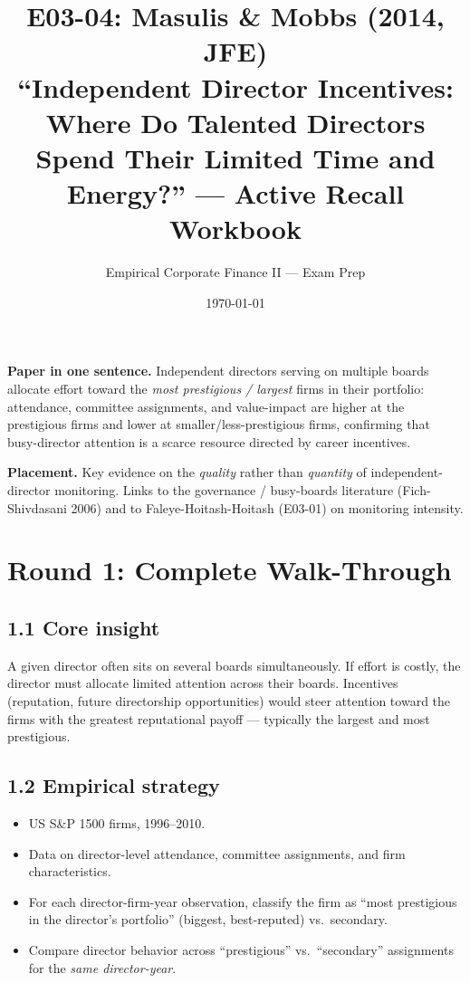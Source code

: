 \documentclass[11pt]{article}
\title{E03-04: Masulis \& Mobbs (2014, JFE) \\
\large ``Independent Director Incentives: Where Do Talented Directors Spend Their Limited Time and Energy?'' --- Active Recall Workbook}
\author{Empirical Corporate Finance II --- Exam Prep}
\date{\today}
\begin{document}
\maketitle

\begin{keybox}
\textbf{Paper in one sentence.} Independent directors serving on multiple boards allocate effort toward the \emph{most prestigious / largest} firms in their portfolio: attendance, committee assignments, and value-impact are higher at the prestigious firms and lower at smaller/less-prestigious firms, confirming that busy-director attention is a scarce resource directed by career incentives.

\textbf{Placement.} Key evidence on the \emph{quality} rather than \emph{quantity} of independent-director monitoring. Links to the governance / busy-boards literature (Fich-Shivdasani 2006) and to Faleye-Hoitash-Hoitash (E03-01) on monitoring intensity.
\end{keybox}

\section*{Round 1: Complete Walk-Through}

\subsection*{1.1 Core insight}
A given director often sits on several boards simultaneously. If effort is costly, the director must allocate limited attention across their boards. Incentives (reputation, future directorship opportunities) would steer attention toward the firms with the greatest reputational payoff --- typically the largest and most prestigious.

\subsection*{1.2 Empirical strategy}
\begin{itemize}
\item US S\&P 1500 firms, 1996--2010.
\item Data on director-level attendance, committee assignments, and firm characteristics.
\item For each director-firm-year observation, classify the firm as ``most prestigious in the director's portfolio'' (biggest, best-reputed) vs.\ secondary.
\item Compare director behavior across ``prestigious'' vs.\ ``secondary'' assignments for the \emph{same director-year}.
\end{itemize}
\end{document}
